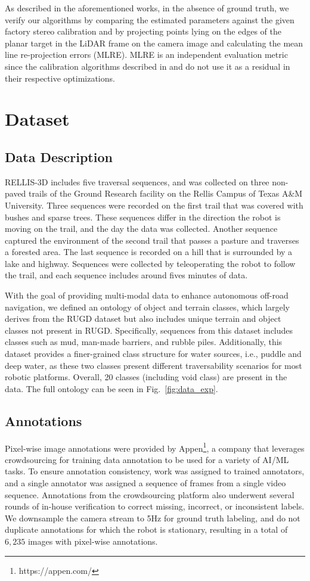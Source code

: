 \documentclass[letterpaper, 10 pt, conference]{ieeeconf}
\begin{document}
As described in the aforementioned works, in the absence of ground truth, we verify our algorithms by comparing the estimated parameters against the given factory stereo calibration and by projecting points lying on the edges of the planar target in the LiDAR frame on the camera image and calculating the mean line re-projection errors (MLRE). MLRE is an independent evaluation metric since the calibration algorithms described in \cite{PBPC} and \cite{mishra2020experimental} do not use it as a residual in their respective optimizations.
 
\section{Dataset}
\subsection{Data Description}
RELLIS-3D includes five traversal sequences, and was collected on three non-paved trails of the Ground Research facility on the Rellis Campus of Texas A\&M University. Three sequences were recorded on the first trail that was covered with bushes and sparse trees. These sequences differ in the direction the robot is moving on the trail, and the day the data was collected. Another sequence captured the environment of the second trail that passes a pasture and traverses a forested area. The last sequence is recorded on a hill that is surrounded by a lake and highway. Sequences were collected by teleoperating the robot to follow the trail, and each sequence includes around fives minutes of data.

With the goal of providing multi-modal data to enhance autonomous off-road navigation, we defined an ontology of object and terrain classes, which largely derives from the RUGD dataset \cite{RUGD2019IROS} but also includes unique terrain and object classes not present in RUGD. Specifically, sequences from this dataset includes classes such as mud, man-made barriers, and rubble piles. Additionally, this dataset provides a finer-grained class structure for water sources, i.e., puddle and deep water, as these two classes present different traversability scenarios for most robotic platforms. Overall, 20 classes (including void class) are present in the data. The full ontology can be seen in Fig.~\ref{fig:data_exp}. \subsection{Annotations}
Pixel-wise image annotations were provided by Appen\footnote{https://appen.com/}, a company that leverages crowdsourcing for training data annotation to be used for a variety of AI/ML tasks. To ensure annotation consistency, work was assigned to trained annotators, and a single annotator was assigned a sequence of frames from a single video sequence. Annotations from the crowdsourcing platform also underwent several rounds of in-house verification to correct missing, incorrect, or inconsistent labels. We downsample the camera stream to 5Hz for ground truth labeling, and do not duplicate annotations for which the robot is stationary, resulting in a total of $6,235$ images with pixel-wise annotations.
\end{document}
